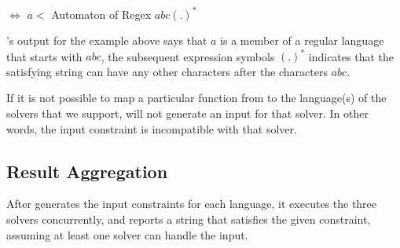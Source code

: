  $\iff$ $a <$ Automaton of Regex $abc(.)^{*}$

\imss's output for the  example above says that $a$ is a member of a regular language that starts with $abc$, the subsequent expression symbols $(.)^{*}$
indicates that the satisfying string can have any other characters after the characters
$abc$.

If it is not possible to map a particular function from \imss to the language(s) of the solvers that we support, \imss will not generate an input
for that solver. In other words, the input constraint is incompatible with that solver.

\subsection{Result Aggregation}
After \imss generates the input constraints for each language, it executes the three solvers concurrently, and
reports a string that satisfies the given constraint, assuming at least one solver can handle the input.
